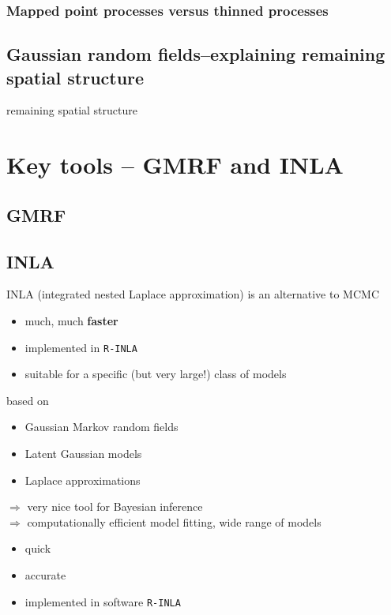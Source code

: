 \subsubsection{Mapped point processes versus thinned processes}

\subsection{Gaussian random fields--explaining remaining spatial structure}

remaining spatial structure




\section{Key tools -- GMRF and INLA}



\subsection{GMRF}

\subsection{INLA}
INLA (integrated nested Laplace approximation) is an alternative to MCMC
\begin{itemize}
\item much, much \textbf{faster}
\item  implemented in \texttt{R-INLA} 
\vspace{0.25cm}
\item suitable for a specific (but very large!) class of models
\end{itemize}

based on 
\begin{itemize}
\item Gaussian Markov random fields 
\item Latent Gaussian models
\item Laplace approximations 
\end{itemize}
$\Rightarrow$ very nice tool for Bayesian inference\\ 
$\Rightarrow$ computationally efficient model fitting, wide range of models
\begin{itemize}
\item quick 
\item accurate 
\item implemented in software \texttt{R-INLA}
\end{itemize}

